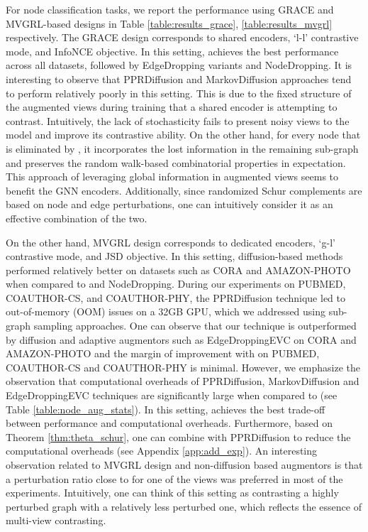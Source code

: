 \documentclass{article}
\theoremstyle{plain}
\theoremstyle{definition}
\theoremstyle{remark}
\begin{document}
For node classification tasks, we report the performance using GRACE and MVGRL-based designs in Table \ref{table:results_grace}, \ref{table:results_mvgrl} respectively. The GRACE design corresponds to shared encoders, `l-l' contrastive mode, and InfoNCE objective. In this setting,  achieves the best performance across all datasets, followed by EdgeDropping variants and NodeDropping. It is interesting to observe that PPRDiffusion and MarkovDiffusion approaches tend to perform relatively poorly in this setting. This is due to the fixed structure of the augmented views during training that a shared encoder is attempting to contrast. Intuitively, the lack of stochasticity fails to present noisy views to the model and improve its contrastive ability. On the other hand, for every node that is eliminated by , it incorporates the lost information in the remaining sub-graph and preserves the random walk-based combinatorial properties in expectation. This approach of leveraging global information in augmented views seems to benefit the GNN encoders. Additionally, since randomized Schur complements are based on node and edge perturbations, one can intuitively consider it as an effective combination of the two.

On the other hand, MVGRL design corresponds to dedicated encoders, `g-l' contrastive mode, and JSD objective. In this setting, diffusion-based methods performed relatively better on datasets such as CORA and AMAZON-PHOTO when compared to  and NodeDropping. During our experiments on PUBMED, COAUTHOR-CS, and COAUTHOR-PHY, the PPRDiffusion technique led to out-of-memory (OOM) issues on a 32GB GPU, which we addressed using sub-graph sampling approaches. One can observe that our technique is outperformed by diffusion and adaptive augmentors such as EdgeDroppingEVC on CORA and AMAZON-PHOTO and the margin of improvement with  on PUBMED, COAUTHOR-CS and COAUTHOR-PHY is minimal. However, we emphasize the observation that computational overheads of PPRDiffusion, MarkovDiffusion and EdgeDroppingEVC techniques are significantly large when compared to  (see Table \ref{table:node_aug_stats}). In this setting,  achieves the best trade-off between performance and computational overheads. Furthermore, based on Theorem \ref{thm:theta_schur}, one can combine  with PPRDiffusion to reduce the computational overheads (see Appendix \ref{app:add_exp}). An interesting observation related to MVGRL design and non-diffusion based augmentors is that a perturbation ratio  close to  for one of the views was preferred in most of the experiments. Intuitively, one can think of this setting as contrasting a highly perturbed graph with a relatively less perturbed one, which reflects the essence of multi-view contrasting.
\end{document}
